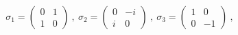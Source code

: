 \begin{equation}
 \sigma_1 = \left(
\begin{array}{rcl}
 0 & 1 \\
 1 & 0 
\end{array}
\right)  ~,~
 \sigma_2 = \left(
\begin{array}{rcl}
 0 & -i \\
 i & 0 
\end{array}
\right) ~,~
\sigma_3 = \left(
\begin{array}{rcl}
 1 & 0 \\
 0 & -1 
\end{array}
\right) ~,
\end{equation} 
